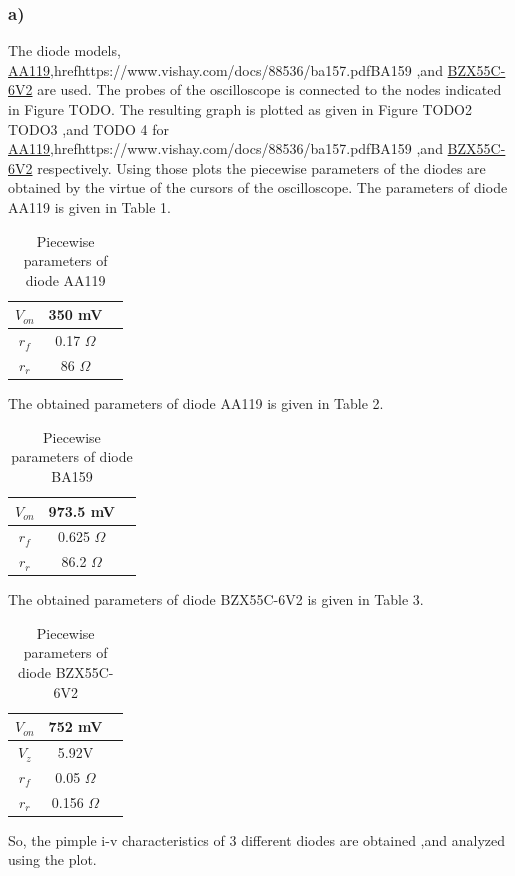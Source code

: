 \documentclass[letterpaper,12pt]{article}
\begin{document}
\subsubsection{a)}
The diode models, \href{https://logosfoundation.org/elektron/mixers/AA119.pdf}{AA119},href{https://www.vishay.com/docs/88536/ba157.pdf}{BA159}  ,and \href{https://www.vishay.com/docs/85604/bzx55.pdf}{BZX55C-6V2} are used. The probes of the oscilloscope is connected to the nodes indicated in Figure TODO. The resulting graph is plotted as given in Figure TODO2 TODO3 ,and TODO 4 for 
\href{https://logosfoundation.org/elektron/mixers/AA119.pdf}{AA119},href{https://www.vishay.com/docs/88536/ba157.pdf}{BA159}  ,and \href{https://www.vishay.com/docs/85604/bzx55.pdf}{BZX55C-6V2} respectively.
Using those plots the piecewise parameters of the diodes are obtained by the virtue of the cursors of the oscilloscope. The parameters of diode AA119 is given in Table 1.

\begin{table}[H]
    \begin{center}
    \caption{Piecewise parameters of diode AA119}
    \vspace{2mm}
    \begin{tabular}{|| c | c | c ||}
    \hline
    \(V_{on}\) & 350 mV \\
    \hline 
    \(r_f\) & 0.17 \(\Omega\) \\
    \hline
    \(r_r\) & 86 \(\Omega\)\\
    \hline
    \end{tabular}
\end{center}
\end{table}
The obtained parameters of diode AA119 is given in Table 2.
\begin{table}[H]
    \centering
    \caption{Piecewise parameters of diode BA159}
    \vspace{2mm}
    \begin{tabular}{||c | c | c||}
    \hline
    \(V_{on}\) & 973.5 mV \\
    \hline
    \(r_f\) & 0.625 \(\Omega\) \\
    \hline
    \(r_r\) & 86.2 \(\Omega\)\\
    \hline
    \end{tabular}
\end{table}
The obtained parameters of diode BZX55C-6V2 is given in Table 3.
\begin{table}[H]
    \centering
    \caption{Piecewise parameters of diode BZX55C-6V2}
    \begin{tabular}{||c | c | c||}
        \hline
    \(V_{on}\) & 752 mV \\
    \hline
    \(V_{z}\) & 5.92V \\
    \hline
    \(r_f\) & 0.05 \(\Omega\) \\
    \hline
    \(r_r\) & 0.156 \(\Omega\) \\
    \hline
    \end{tabular}
\end{table}
So, the pimple i-v characteristics of 3 different diodes are obtained ,and analyzed using the plot.
\end{document}
